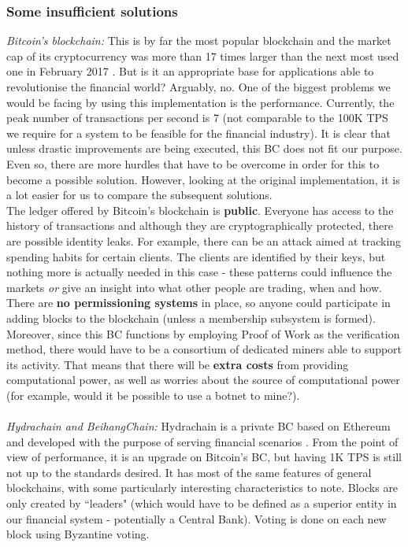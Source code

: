 \documentclass[12pt,twoside]{article}
\begin{document}
\subsubsection{Some insufficient solutions}
\label{sub:Insufficient}
\textit{Bitcoin's blockchain:} This is by far the most popular blockchain and the market cap of its cryptocurrency was more than 17 times larger than the next most used one in February 2017 \cite{BC:MC}. But is it an appropriate base for applications able to revolutionise the financial world? Arguably, no. One of the biggest problems we would be facing by using this implementation is the performance. Currently, the peak number of transactions per second is 7 (not comparable to the 100K TPS we require for a system to be feasible for the financial industry). It is clear that unless drastic improvements are being executed, this BC does not fit our purpose. Even so, there are more hurdles that have to be overcome in order for this to become a possible solution. However, looking at the original implementation, it is a lot easier for us to compare the subsequent solutions. 
\\
The ledger offered by Bitcoin's blockchain is \textbf{public}. Everyone has access to the history of transactions and although they are cryptographically protected, there are possible identity leaks. For example, there can be an attack aimed at tracking spending habits for certain clients. The clients are identified by their keys, but nothing more is actually needed in this case - these patterns could influence the markets \textit{or} give an insight into what other people are trading, when and how. There are \textbf{no permissioning systems} in place, so anyone could participate in adding blocks to the blockchain (unless a membership subsystem is formed). Moreover, since this BC functions by employing Proof of Work as the verification method, there would have to be a consortium of dedicated miners able to support its activity. That means that there will be \textbf{extra costs} from providing computational power, as well as worries about the source of computational power (for example, would it be possible to use a botnet to mine?).
\\ \\
\textit{Hydrachain and BeihangChain:} Hydrachain is a private BC based on Ethereum and developed with the purpose of serving financial scenarios \cite{Chinese}. From the point of view of performance, it is an upgrade on Bitcoin's BC, but having 1K TPS is still not up to the standards desired. It has most of the same features of general blockchains, with some particularly interesting characteristics to note. Blocks are only created by ``leaders" (which would have to be defined as a superior entity in our financial system - potentially a Central Bank). Voting is done on each new block using Byzantine voting. 
\end{document}
